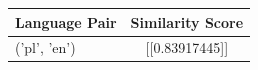 \begin{tabular}{|l|c|}
\hline
Language Pair & Similarity Score \\
\hline
('pl', 'en') & [[0.83917445]] \\
\hline
\end{tabular}

